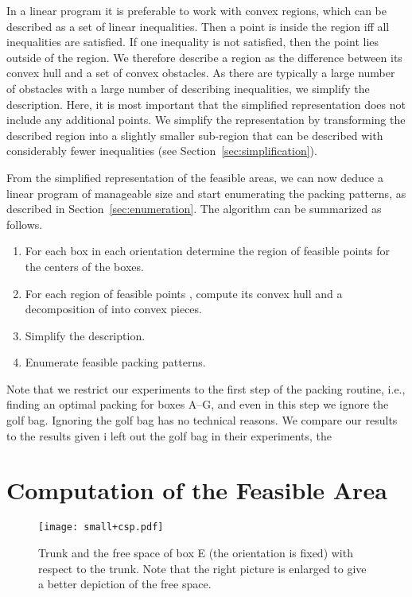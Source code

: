 \documentclass{article}
\newcounter{algo}
\begin{document}
In a linear program it is preferable to work with convex regions,
which can be described as a set of linear inequalities. Then a point
is inside the region iff all inequalities are satisfied. If one
inequality is not satisfied, then the point lies outside of the
region. We therefore describe a region as the difference between its
convex hull and a set of convex obstacles. As there are typically a
large number of obstacles with a large number of describing
inequalities, we simplify the description.  Here, it is most important
that the simplified representation does not include any additional
points. We simplify the representation by transforming the described
region into a slightly smaller sub-region that can be described with
considerably fewer inequalities (see
Section~\ref{sec:simplification}).

From the simplified representation of the feasible areas, we can now
deduce a linear program of manageable size and start enumerating the
packing patterns, as described in Section~\ref{sec:enumeration}. The
algorithm can be summarized as follows.

\begin{enumerate}
\item For each box in each orientation determine the region of
feasible points for the centers of the boxes.
\item For each region of feasible points , compute its convex hull
   and a decomposition of  into convex pieces.
\item Simplify the description.
\item Enumerate feasible packing patterns.
\end{enumerate}

Note that we restrict our experiments to the first step of the packing
routine, i.e., finding an optimal packing for boxes A--G, and even in
this step we ignore the golf bag. Ignoring the golf bag has no
technical reasons. We compare our results to the results given i
left out the golf bag in their experiments, the


\section{Computation of the Feasible Area}
\label{sec:feasiblearea}

\begin{figure}[t]
\center \texttt{[image: small+csp.pdf]}
\caption{
\label{fig:csp}
Trunk and the free space of box E (the orientation is fixed) with
respect to the trunk. Note that the right picture is enlarged to give
a better depiction of the free space.}
\end{figure}
\end{document}

